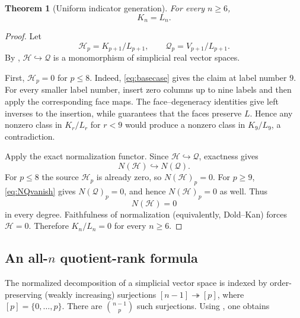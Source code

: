 \documentclass[11pt]{article}
\newtheorem{theorem}{Theorem}[section]
\newtheorem{corollary}[theorem]{Corollary}
\newcommand{\U}{\mathcal U}
\newcommand{\Qcal}{\mathcal Q}
\newcommand{\Hcal}{\mathcal H}
\newcommand{\1}{\mathbf 1}
\newcommand{\rank}{\operatorname{rank}}
\begin{document}
\begin{theorem}[Uniform indicator generation]\label{thm:KL}
For every $n\ge6$,
\[
K_n=L_n.
\]
\end{theorem}

\begin{proof}
Let
\[
\Hcal_p=K_{p+1}/L_{p+1},\qquad
\Qcal_p=V_{p+1}/L_{p+1}.
\]
By , $\Hcal\hookrightarrow\Qcal$ is a monomorphism of
simplicial real vector spaces.

First, $\Hcal_p=0$ for $p\le8$.  Indeed, \eqref{eq:basecase} gives the
claim at label number $9$.  For every smaller label number, insert zero
columns up to nine labels and then apply the corresponding face maps.  The
face--degeneracy identities give left inverses to the insertion, while
 guarantees that the faces preserve $L$.  Hence any
nonzero class in $K_r/L_r$ for $r<9$ would produce a nonzero class in
$K_9/L_9$, a contradiction.

Apply the exact normalization functor.  Since
$\Hcal\hookrightarrow\Qcal$, exactness gives
\[
N(\Hcal)\hookrightarrow N(\Qcal).
\]
For $p\le8$ the source $\Hcal_p$ is already zero, so
$N(\Hcal)_p=0$.  For $p\ge9$, \eqref{eq:NQvanish} gives
$N(\Qcal)_p=0$, and hence $N(\Hcal)_p=0$ as well.  Thus
\[
N(\Hcal)=0
\]
in every degree.  Faithfulness of normalization (equivalently, Dold--Kan)
forces $\Hcal=0$.  Therefore $K_n/L_n=0$ for every $n\ge6$.
\end{proof}

\subsection{An all-\texorpdfstring{$n$}{n} quotient-rank formula}
The normalized decomposition of a simplicial vector space is indexed by
order-preserving (weakly increasing) surjections $[n-1]\twoheadrightarrow[p]$,
where $[p]=\{0,\dots,p\}$.  There are $\binom{n-1}{p}$ such surjections.
Using , one obtains
\end{document}

